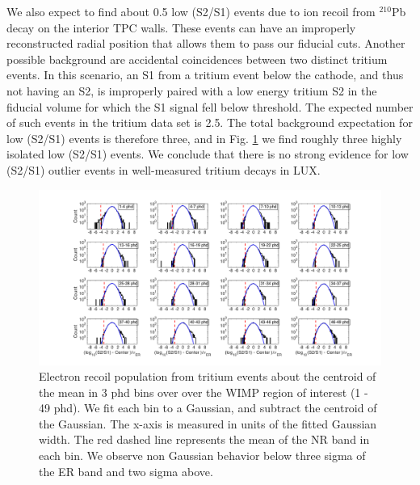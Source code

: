 We also expect to find about 0.5 low (S2/S1) events due to ion recoil from $^{210}$Pb decay on the interior TPC walls. These events can have an improperly reconstructed radial position that allows them to pass our fiducial cuts.  Another possible background are accidental coincidences between two distinct tritium events. In this scenario, an S1 from a tritium event below the cathode, and thus not having an S2, is improperly paired with a low energy tritium S2 in the fiducial volume for which the S1 signal fell below threshold. The expected number of such events in the tritium data set is 2.5. The total background expectation for low (S2/S1) events is therefore three, and in Fig. \ref{fig:ER-Gauss} we find roughly three highly isolated low (S2/S1) events. We conclude that there is no strong evidence for low (S2/S1) outlier events in well-measured tritium decays in LUX.

\onecolumngrid
\break
\begin{figure}[h!]
\includegraphics[width=180mm]{fig/Gaussianity/GaussER_all.png}
\caption{Electron recoil population from tritium events about the centroid of the mean in 3 phd bins over over the WIMP region of interest (1 - 49 phd). We fit each bin to a Gaussian, and subtract the centroid of the Gaussian. The x-axis is measured in units of the fitted Gaussian width. The red dashed line represents the mean of the NR band in each bin. We observe non Gaussian behavior below three sigma of the ER band and two sigma above.  }
\label{fig:ER-Gauss}
\end{figure}
\twocolumngrid


